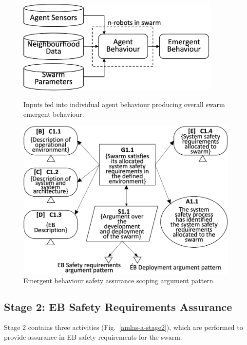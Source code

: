 \documentclass[runningheads]{llncs}
\begin{document}
\begin{figure}[!t]
	\centering
	\begin{minipage}{.5\textwidth}
		\centering
		\includegraphics[width=0.9\textwidth]{figures/stage1-systema-v2.png}
		\caption{Inputs fed into individual agent behaviour producing overall swarm emergent behaviour. }%
		\label{system-description}
	\end{minipage}%
	\begin{minipage}{.45\textwidth}
		\centering
		\includegraphics[width=0.99\textwidth]{figures/stage1-argumentpattern-v3.png}
		\vspace{-5ex}
		\caption{Emergent behaviour safety assurance scoping argument pattern.}
		\label{stage1-ap}
	\end{minipage}	
	\vspace{-4ex}
\end{figure}

\subsection{Stage 2: EB Safety Requirements Assurance} \label{framework-stage2}
Stage 2 contains three activities (Fig.~\ref{amlas-a-stage2}), which are performed to provide assurance in EB safety requirements for the swarm. 
\end{document}
